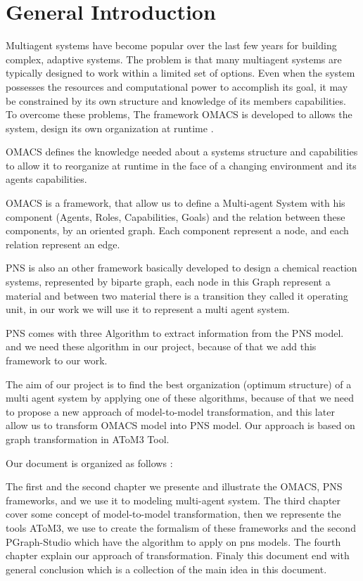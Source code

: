 \chapter*{General Introduction}

\textbf{}



Multiagent systems have become popular over the last few years for building complex, adaptive systems. 
The problem is that many multiagent systems are typically designed to work within 
a limited set of options. Even when the system possesses the resources and
computational power to accomplish its goal, it may be constrained by its own structure and knowledge
of its members capabilities. To overcome these problems, The framework OMACS is developed to allows the system, design its own organization at runtime \cite{omacs4}.

OMACS defines the knowledge needed about a systems structure and capabilities to allow it to reorganize at runtime in the face of a changing environment and its agents capabilities\cite{omacs4}\cite{omacs2}.

OMACS is a framework, that allow us to define a Multi-agent System with his component (Agents, Roles, Capabilities, Goals) and the relation between these components, 
by an oriented graph. Each component represent a node, and each relation represent an edge.
 
PNS is also an other framework basically developed to design a chemical reaction systems, represented by biparte graph, each node in this Graph represent a material and between two material there is a transition they called it operating unit, in our work we will use it to represent a multi agent system. 

PNS comes with three Algorithm to extract information from the PNS model. and we need these algorithm in our project, because of that we add this framework to our work.

The aim of our project is to find the best organization (optimum structure) of a multi agent system by applying one of these algorithms, 
because of that we need to propose a new approach of model-to-model transformation, and this later allow us to transform OMACS model into PNS model. Our approach is based on graph transformation in AToM3 Tool.

Our document is organized as follows :

The first and the second chapter we presente and illustrate the OMACS, PNS frameworks, and we use it to modeling multi-agent system.
The third chapter cover some concept of model-to-model transformation, then we represente the tools AToM3, we use to create the formalism of these frameworks and the second PGraph-Studio which have the algorithm to apply on pns models. 
The fourth chapter explain our approach of transformation. 
Finaly this document end with general conclusion which is a collection of the main idea in this document.

 



